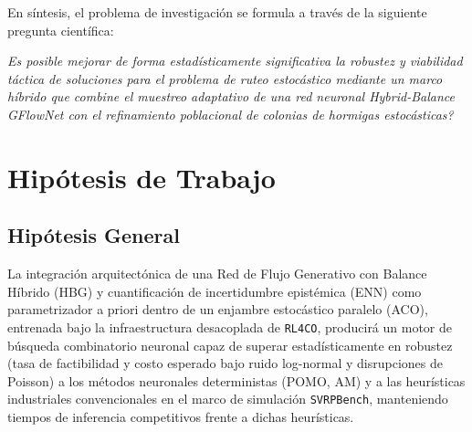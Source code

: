 \documentclass[12pt]{report}
\begin{document}
En s\'intesis, el problema de investigaci\'on se formula a trav\'es de la siguiente pregunta cient\'ifica:

\begin{center}
  \colorbox{lightbg}{%
    \begin{minipage}{0.85\textwidth}
      \vspace{0.4cm}
      \centering
      \textit{\guillemotleft\textquestiondown Es posible mejorar de forma estad\'isticamente significativa la robustez y viabilidad t\'actica de soluciones para el problema de ruteo estoc\'astico mediante un marco h\'ibrido que combine el muestreo adaptativo de una red neuronal Hybrid-Balance GFlowNet con el refinamiento poblacional de colonias de hormigas estoc\'asticas?\guillemotright}
      \vspace{0.4cm}
    \end{minipage}%
  }
\end{center}

\chapter*{Hip\'otesis de Trabajo}

\section*{Hip\'otesis General}
La integraci\'on arquitect\'onica de una Red de Flujo Generativo con Balance H\'ibrido (HBG) y cuantificaci\'on de incertidumbre epist\'emica (ENN) como parametrizador a priori dentro de un enjambre estoc\'astico paralelo (ACO), entrenada bajo la infraestructura desacoplada de \texttt{RL4CO}, producir\'a un motor de b\'usqueda combinatorio neuronal capaz de superar estad\'isticamente en robustez (tasa de factibilidad y costo esperado bajo ruido log-normal y disrupciones de Poisson) a los m\'etodos neuronales deterministas (POMO, AM) y a las heur\'isticas industriales convencionales en el marco de simulaci\'on \texttt{SVRPBench}, manteniendo tiempos de inferencia competitivos frente a dichas heur\'isticas.
\end{document}
